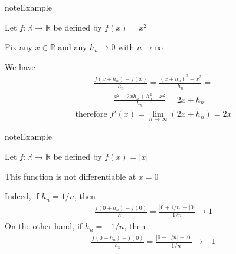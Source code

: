 \documentclass[letterpaper,10pt,english]{jupyterBook}
\begin{document}
\begin{sphinxadmonition}{note}{Example}

\sphinxAtStartPar
Let \(f \colon \mathbb{R} \to \mathbb{R}\) be defined by \(f(x) = x^2\)

\sphinxAtStartPar
Fix any \(x \in \mathbb{R}\) and any \(h_n \to 0\) with \(n \to \infty\)

\sphinxAtStartPar
We have
\begin{equation*}
\begin{split}
\frac{f(x + h_n) - f(x)}{h_n} 
= \frac{(x + h_n)^2 - x^2}{h_n} =
\end{split}
\end{equation*}\begin{equation*}
\begin{split}
= \frac{x^2 + 2xh_n + h_n^2 - x^2}{h_n}
= 2x + h_n
\end{split}
\end{equation*}\begin{equation*}
\begin{split}
\text{therefore }
f'(x)
= \lim_{n \to \infty} (2x + h_n)
= 2x
\end{split}
\end{equation*}\end{sphinxadmonition}

\begin{sphinxadmonition}{note}{Example}

\sphinxAtStartPar
Let \(f \colon \mathbb{R} \to \mathbb{R}\) be defined by \(f(x) = |x|\)

\sphinxAtStartPar
This function is not differentiable at \(x=0\)

\sphinxAtStartPar
Indeed, if \(h_n = 1/n\), then
\begin{equation*}
\begin{split}
\frac{f(0 + h_n) - f(0)}{h_n} 
= \frac{|0 + 1/n| - |0|}{1/n} \to 1
\end{split}
\end{equation*}
\sphinxAtStartPar
On the other hand, if \(h_n = -1/n\), then
\begin{equation*}
\begin{split}
\frac{f(0 + h_n) - f(0)}{h_n} 
= \frac{|0 - 1/n| - |0|}{-1/n} \to -1
\end{split}
\end{equation*}\end{sphinxadmonition}
\end{document}
